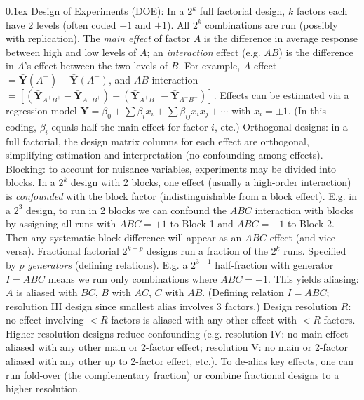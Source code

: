 \documentclass[10pt]{article}
\makeatletter
\renewcommand{\section}{\@startsection{section}{1}{0mm}
  {-0.1ex}%
  {0.1ex}%
  {\normalfont\normalsize\bfseries\color{thm-color}}}
\newcommand{\vect}[1]{\symbf{#1}} %
\makeatother
\begin{document}
\begin{multicols}{3}
  \section{Design of Experiments (DOE):}
  In a \( 2^k \) full factorial design, \( k \) factors each have 2 levels (often coded \( -1 \) and \( +1 \)). All \( 2^k \) combinations are run (possibly with replication). The \textit{main effect} of factor \( A \) is the difference in average response between high and low levels of \( A \); an \textit{interaction} effect (e.g. \( A\!B \)) is the difference in \( A \)'s effect between the two levels of \( B \).
  For example, \( A \) effect \( = \bar{\vect{Y}}(A^+) - \bar{\vect{Y}}(A^-) \), and \( AB \) interaction \( = [(\bar{\vect{Y}}_{A^+B^+}-\bar{\vect{Y}}_{A^-B^+}) - (\bar{\vect{Y}}_{A^+B^-}-\bar{\vect{Y}}_{A^-B^-})] \).
  Effects can be estimated via a regression model \( \vect{Y} = \beta_0 + \sum \beta_i x_i + \sum \beta_{ij}x_i x_j + \cdots \) with \( x_i=\pm1 \). (In this coding, \( \beta_i \) equals half the main effect for factor \( i \), etc.)
  Orthogonal designs: in a full factorial, the design matrix columns for each effect are orthogonal, simplifying estimation and interpretation (no confounding among effects).
  Blocking: to account for nuisance variables, experiments may be divided into blocks. In a \( 2^k \) design with 2 blocks, one effect (usually a high-order interaction) is \textit{confounded} with the block factor (indistinguishable from a block effect).
  E.g. in a \( 2^3 \) design, to run in 2 blocks we can confound the \( ABC \) interaction with blocks by assigning all runs with \( ABC=+1 \) to Block 1 and \( ABC=-1 \) to Block 2. Then any systematic block difference will appear as an \( ABC \) effect (and vice versa).
  Fractional factorial \( 2^{k-p} \) designs run a fraction of the \( 2^k \) runs. Specified by \( p \) \textit{generators} (defining relations).
  E.g. a \( 2^{3-1} \) half-fraction with generator \( I=ABC \) means we run only combinations where \( ABC=+1 \). This yields aliasing: \( A \) is aliased with \( BC \), \( B \) with \( AC \), \( C \) with \( AB \). (Defining relation \( I=ABC \); resolution III design since smallest alias involves 3 factors.)
  Design resolution \( R \): no effect involving \( <R \) factors is aliased with any other effect with \( <R \) factors. Higher resolution designs reduce confounding (e.g. resolution IV: no main effect aliased with any other main or 2-factor effect; resolution V: no main or 2-factor aliased with any other up to 2-factor effect, etc.).
  To de-alias key effects, one can run fold-over (the complementary fraction) or combine fractional designs to a higher resolution.
\end{multicols}
\end{document}
